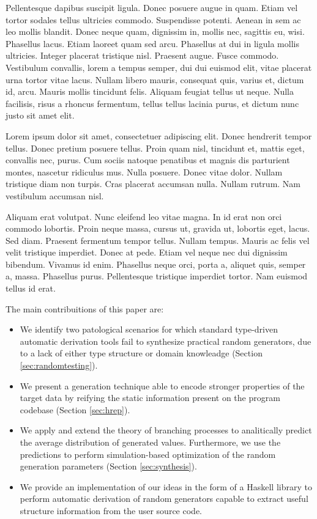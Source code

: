 \documentclass[conference]{IEEEtran}
\begin{document}
Pellentesque dapibus suscipit ligula. Donec posuere augue in quam. Etiam vel
tortor sodales tellus ultricies commodo. Suspendisse potenti. Aenean in sem ac
leo mollis blandit. Donec neque quam, dignissim in, mollis nec, sagittis eu,
wisi. Phasellus lacus. Etiam laoreet quam sed arcu. Phasellus at dui in ligula
mollis ultricies. Integer placerat tristique nisl. Praesent augue. Fusce
commodo. Vestibulum convallis, lorem a tempus semper, dui dui euismod elit,
vitae placerat urna tortor vitae lacus. Nullam libero mauris, consequat quis,
varius et, dictum id, arcu. Mauris mollis tincidunt felis. Aliquam feugiat
tellus ut neque. Nulla facilisis, risus a rhoncus fermentum, tellus tellus
lacinia purus, et dictum nunc justo sit amet elit.

Lorem ipsum dolor sit amet, consectetuer adipiscing elit. Donec hendrerit tempor
tellus. Donec pretium posuere tellus. Proin quam nisl, tincidunt et, mattis
eget, convallis nec, purus. Cum sociis natoque penatibus et magnis dis
parturient montes, nascetur ridiculus mus. Nulla posuere. Donec vitae dolor.
Nullam tristique diam non turpis. Cras placerat accumsan nulla. Nullam rutrum.
Nam vestibulum accumsan nisl.

Aliquam erat volutpat. Nunc eleifend leo vitae magna. In id erat non orci
commodo lobortis. Proin neque massa, cursus ut, gravida ut, lobortis eget,
lacus. Sed diam. Praesent fermentum tempor tellus. Nullam tempus. Mauris ac
felis vel velit tristique imperdiet. Donec at pede. Etiam vel neque nec dui
dignissim bibendum. Vivamus id enim. Phasellus neque orci, porta a, aliquet
quis, semper a, massa. Phasellus purus. Pellentesque tristique imperdiet tortor.
Nam euismod tellus id erat\cite{grieco2017}.

The main contribuitions of this paper are:
%
\begin{itemize}
\item We identify two patological scenarios for which standard type-driven
  automatic derivation tools fail to synthesize practical random generators, due
  to a lack of either type structure or domain knowleadge (Section
  \ref{sec:randomtesting}).
\item We present a generation technique able to encode stronger properties of
  the target data by reifying the static information present on the program
  codebase (Section \ref{sec:hrep}).
\item We apply and extend the theory of branching processes to analitically
  predict the average distribution of generated values.
  Furthermore, we use the predictions to perform simulation-based optimization
  of the random generation parameters (Section \ref{sec:synthesis}).
\item We provide an implementation of our ideas in the form of a Haskell library
  to perform automatic derivation of random generators capable to extract
  useful structure information from the user source code.
\end{itemize}
\end{document}
